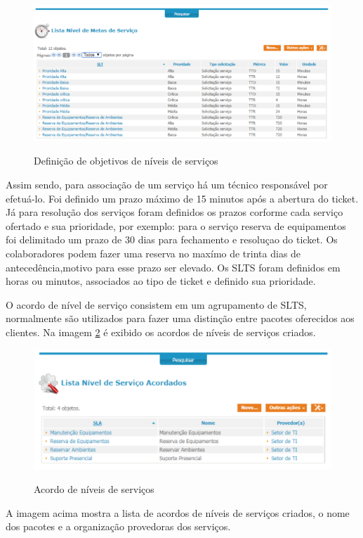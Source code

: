 \documentclass[eso]{bcc}
\begin{document}
\begin{figure}[!h]
\centering
\caption[Definição de objetivos de níveis de serviços]{Definição de objetivos de níveis de serviços}
\includegraphics[scale=0.9]{Figuras/itop3.png}
\label{definicao}
\end{figure}

Assim sendo, para associação de um serviço há um técnico responsável por efetuá-lo. Foi definido um prazo máximo de 15 minutos após a abertura do ticket. Já para resolução dos serviços foram definidos os prazos corforme cada serviço ofertado e sua prioridade, por exemplo: para o serviço reserva de equipamentos foi delimitado um prazo de 30 dias para fechamento e resoluçao do ticket. Os colaboradores podem fazer uma reserva no maxímo de trinta dias de antecedência,motivo para esse prazo  ser elevado.  Os SLTS foram definidos em horas ou minutos, associados ao tipo de ticket e definido sua prioridade. 

O acordo de nível de serviço consistem em um agrupamento de SLTS, normalmente são utilizados para fazer uma distinção entre pacotes oferecidos aos clientes. Na imagem \ref{acordo} é exibido os acordos de níveis de serviços criados.

\newpage

\begin{figure}[!h]
\centering
\caption[Acordo de níveis de serviços]{Acordo de níveis de serviços}
\includegraphics[scale=0.9]{Figuras/itop4.png}
\label{acordo}
\end{figure}
A imagem acima mostra a lista de acordos de níveis de serviços criados, o nome dos pacotes e a organização provedoras dos serviços. 
\end{document}
